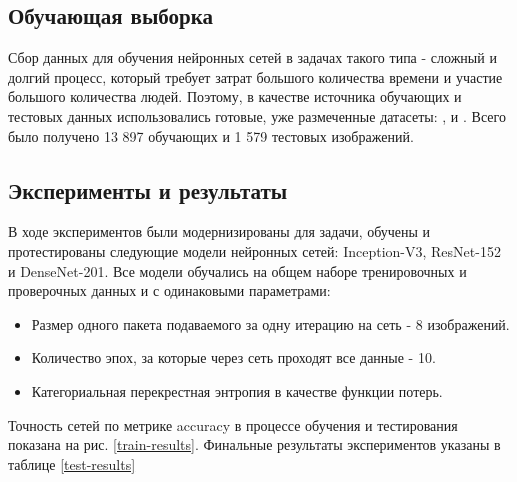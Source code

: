 
\subsection{Обучающая выборка}
Сбор данных для обучения нейронных сетей в задачах такого типа - сложный и долгий процесс, который требует затрат большого количества времени и участие большого количества людей. Поэтому, в качестве источника обучающих и тестовых данных использовались готовые, уже размеченные датасеты: \cite{tawsifurrahman}, \cite{cohen2020covid} и \cite{wang2020covidnet}. 
Всего было получено 13 897 обучающих и 1 579 тестовых изображений.

% 


\subsection{Эксперименты и результаты}
В ходе экспериментов были модернизированы для задачи, обучены и протестированы следующие модели нейронных сетей: Inception-V3, ResNet-152 и DenseNet-201. Все модели обучались на общем наборе тренировочных и проверочных данных и с одинаковыми параметрами:
\begin{itemize}
    \item Размер одного пакета подаваемого за одну итерацию на сеть - 8 изображений.
    \item Количество эпох, за которые через сеть проходят все данные - 10.
    \item Категориальная перекрестная энтропия в качестве функции потерь.
\end{itemize}
Точность сетей по метрике accuracy в процессе обучения и тестирования показана на рис. \ref{train-results}. Финальные результаты экспериментов указаны в таблице \ref{test-results}





\clearpage